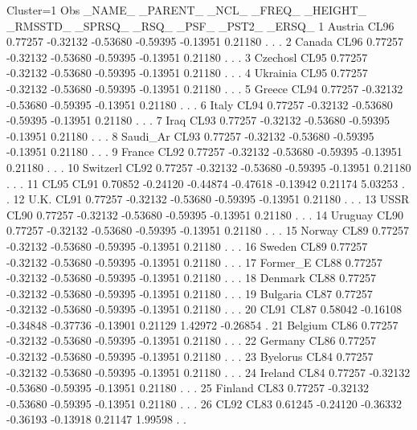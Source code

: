 \documentclass{article}
\begin{document}
\begin{Woutput}
Cluster=1
Obs _NAME_   _PARENT_  _NCL_   _FREQ_  _HEIGHT_ _RMSSTD_  _SPRSQ_  _RSQ_    _PSF_   _PST2_  _ERSQ_
  1 Austria    CL96   0.77257 -0.32132 -0.53680 -0.59395 -0.13951 0.21180   .        .         .
  2 Canada     CL96   0.77257 -0.32132 -0.53680 -0.59395 -0.13951 0.21180   .        .         .
  3 Czechosl   CL95   0.77257 -0.32132 -0.53680 -0.59395 -0.13951 0.21180   .        .         .
  4 Ukrainia   CL95   0.77257 -0.32132 -0.53680 -0.59395 -0.13951 0.21180   .        .         .
  5 Greece     CL94   0.77257 -0.32132 -0.53680 -0.59395 -0.13951 0.21180   .        .         .
  6 Italy      CL94   0.77257 -0.32132 -0.53680 -0.59395 -0.13951 0.21180   .        .         .
  7 Iraq       CL93   0.77257 -0.32132 -0.53680 -0.59395 -0.13951 0.21180   .        .         .
  8 Saudi_Ar   CL93   0.77257 -0.32132 -0.53680 -0.59395 -0.13951 0.21180   .        .         .
  9 France     CL92   0.77257 -0.32132 -0.53680 -0.59395 -0.13951 0.21180   .        .         .
 10 Switzerl   CL92   0.77257 -0.32132 -0.53680 -0.59395 -0.13951 0.21180   .        .         .
 11 CL95       CL91   0.70852 -0.24120 -0.44874 -0.47618 -0.13942 0.21174  5.03253   .         .
 12 U.K.       CL91   0.77257 -0.32132 -0.53680 -0.59395 -0.13951 0.21180   .        .         .
 13 USSR       CL90   0.77257 -0.32132 -0.53680 -0.59395 -0.13951 0.21180   .        .         .
 14 Uruguay    CL90   0.77257 -0.32132 -0.53680 -0.59395 -0.13951 0.21180   .        .         .
 15 Norway     CL89   0.77257 -0.32132 -0.53680 -0.59395 -0.13951 0.21180   .        .         .
 16 Sweden     CL89   0.77257 -0.32132 -0.53680 -0.59395 -0.13951 0.21180   .        .         .
 17 Former_E   CL88   0.77257 -0.32132 -0.53680 -0.59395 -0.13951 0.21180   .        .         .
 18 Denmark    CL88   0.77257 -0.32132 -0.53680 -0.59395 -0.13951 0.21180   .        .         .
 19 Bulgaria   CL87   0.77257 -0.32132 -0.53680 -0.59395 -0.13951 0.21180   .        .         .
 20 CL91       CL87   0.58042 -0.16108 -0.34848 -0.37736 -0.13901 0.21129  1.42972 -0.26854    .
 21 Belgium    CL86   0.77257 -0.32132 -0.53680 -0.59395 -0.13951 0.21180   .        .         .
 22 Germany    CL86   0.77257 -0.32132 -0.53680 -0.59395 -0.13951 0.21180   .        .         .
 23 Byelorus   CL84   0.77257 -0.32132 -0.53680 -0.59395 -0.13951 0.21180   .        .         .
 24 Ireland    CL84   0.77257 -0.32132 -0.53680 -0.59395 -0.13951 0.21180   .        .         .
 25 Finland    CL83   0.77257 -0.32132 -0.53680 -0.59395 -0.13951 0.21180   .        .         .
 26 CL92       CL83   0.61245 -0.24120 -0.36332 -0.36193 -0.13918 0.21147  1.99598   .         .

\end{Woutput}
\end{document}
